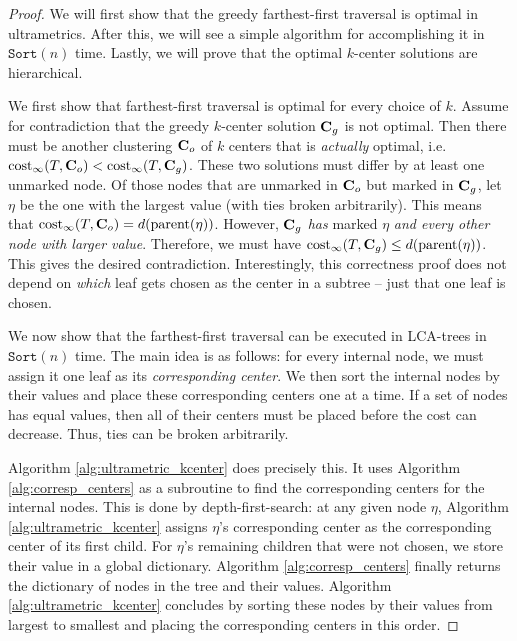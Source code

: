 \begin{proof}

    We will first show that the greedy farthest-first traversal is optimal in ultrametrics. After this, we will see a simple algorithm for accomplishing it in
    $\texttt{Sort}(n)$ time. Lastly, we will prove that the optimal $k$-center solutions are hierarchical.

    We first show that farthest-first traversal is optimal for every choice of $k$. Assume for contradiction that the greedy $k$-center solution $\mathbf{C}_g$ is not
    optimal. Then there must be another clustering $\mathbf{C}_o$ of $k$ centers that is \emph{actually} optimal, i.e. $\text{cost}_{\infty}(T, \mathbf{C}_o) < \text{cost}_{\infty}(T,
    \mathbf{C}_g)$. These two solutions must differ by at least one unmarked node. Of those nodes that are unmarked in $\mathbf{C}_o$ but marked in $\mathbf{C}_g$, let $\eta$ be the
    one with the largest value (with ties broken arbitrarily).  This means that $\text{cost}_\infty(T, \mathbf{C}_o) = d(\text{parent}(\eta))$. However, $\mathbf{C}_g$ \emph{has}
    marked $\eta$ \emph{and every other node with larger value}. Therefore, we must have $\text{cost}_\infty(T, \mathbf{C}_g) \leq d(\text{parent}(\eta))$. This gives the
    desired contradiction. Interestingly, this correctness proof does not depend on \emph{which} leaf gets chosen as the center in a subtree -- just that one
    leaf is chosen.
    
    We now show that the farthest-first traversal can be executed in LCA-trees in $\texttt{Sort}(n)$ time.
    The main idea is as follows: for every internal node, we must assign it one leaf as its \emph{corresponding center}.  We then sort the internal nodes by
    their values and place these corresponding centers one at a time. If a set of nodes has equal values, then all of their centers must be placed before the
    cost can decrease. Thus, ties can be broken arbitrarily.


    Algorithm \ref{alg:ultrametric_kcenter} does precisely this.
    It uses Algorithm \ref{alg:corresp_centers} as a subroutine to find the corresponding centers for the internal nodes. This is done by depth-first-search: at any given node $\eta$, Algorithm \ref{alg:ultrametric_kcenter} assigns $\eta$'s corresponding center as the corresponding center of its first
    child.  For $\eta$'s remaining children that were not chosen, we store their value in a global dictionary. Algorithm \ref{alg:corresp_centers} finally
    returns the dictionary of nodes in the tree and their values.  Algorithm \ref{alg:ultrametric_kcenter} concludes by sorting these nodes by their values from largest to smallest and placing the corresponding centers in this order.


\end{proof}
